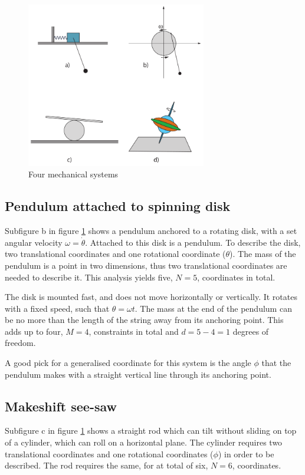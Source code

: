 \documentclass[11pt]{amsart}
\begin{document}
\begin{figure}
	\centering
	\includegraphics[width = 0.7\textwidth]{./figures/problem1.png}
	\caption{Four mechanical systems}
	\label{fig:mechanicalsystems}
\end{figure}

\subsection{Pendulum attached to spinning disk}
Subfigure b in figure \ref{fig:mechanicalsystems} shows a pendulum anchored to a rotating disk, with a set angular velocity $\omega=\dot{\theta}$. Attached to this disk is a pendulum. To describe the disk, two translational coordinates and one rotational coordinate ($\theta$). The mass of the pendulum is a point in two dimensions, thus two translational coordinates are needed to describe it. This analysis yields five, $N=5$, coordinates in total. 

The  disk is mounted fast, and does not move horizontally or vertically. It rotates with a fixed speed, such that $\theta = \omega t$. The mass at the end of the pendulum can be no more than the length of the string away from its anchoring point. This adds up to four, $M=4$, constraints in total and $d = 5-4=1$ degrees of freedom.

A good pick for a generalised coordinate for this system is the angle $\phi$ that the pendulum makes with a straight vertical line through its anchoring point.

\subsection{Makeshift see-saw}
Subfigure c in figure \ref{fig:mechanicalsystems} shows a straight rod which can tilt without sliding on top of a cylinder, which can roll on a horizontal plane. The cylinder requires two translational coordinates and one rotational coordinates ($\phi$) in order to be described. The rod requires the same, for at total of six, $N=6$, coordinates.
\end{document}
